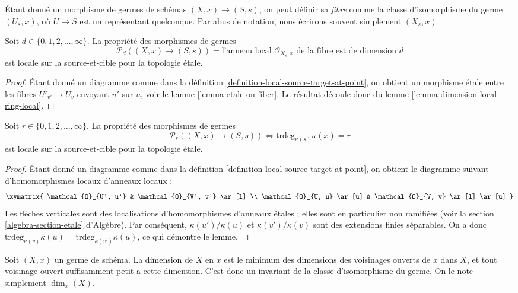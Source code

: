 \noindent
Étant donné un morphisme de germes de schémas $(X, x) \to (S, s)$,
on peut définir sa {\it fibre} comme la classe d'isomorphisme du germe
$(U_s, x)$, où $U \to S$ est un représentant quelconque. Par abus de
notation, nous écrirons souvent simplement $(X_s, x)$.

\begin{lemma}
\label{lemma-dimension-local-ring-fibre}
Soit $d \in \{0, 1, 2, \ldots, \infty\}$.
La propriété des morphismes de germes
$$
\mathcal{P}_d((X, x) \to (S, s)) =
\text{l'anneau local }
\mathcal{O}_{X_s, x}
\text{ de la fibre est de dimension }d
$$
est locale sur la source-et-cible pour la topologie \'etale.
\end{lemma}

\begin{proof}
Étant donné un diagramme comme dans la
définition \ref{definition-local-source-target-at-point}, on obtient un
morphisme \'etale entre les fibres $U'_{v'} \to U_v$ envoyant $u'$ sur $u$,
voir le lemme \ref{lemma-etale-on-fiber}. Le résultat découle donc du
lemme \ref{lemma-dimension-local-ring-local}.
\end{proof}

\begin{lemma}
\label{lemma-transcendence-degree-at-point}
Soit $r \in \{0, 1, 2, \ldots, \infty\}$.
La propriété des morphismes de germes
$$
\mathcal{P}_r((X, x) \to (S, s))
\Leftrightarrow
\text{trdeg}_{\kappa(s)} \kappa(x) = r
$$
est locale sur la source-et-cible pour la topologie \'etale.
\end{lemma}

\begin{proof}
Étant donné un diagramme comme dans la
définition \ref{definition-local-source-target-at-point}, on obtient le
diagramme suivant d'homomorphismes locaux d'anneaux locaux :
$$
\xymatrix{
\mathcal{O}_{U', u'} & \mathcal{O}_{V', v'} \ar[l] \\
\mathcal{O}_{U, u} \ar[u] & \mathcal{O}_{V, v} \ar[l] \ar[u]
}
$$
Les flèches verticales sont des localisations d'homomorphismes d'anneaux
étales ; elles sont en particulier non ramifiées (voir la
section \ref{algebra-section-etale} d'Algèbre).
Par conséquent, $\kappa(u')/\kappa(u)$ et $\kappa(v')/\kappa(v)$ sont des
extensions finies séparables. On a donc
$\text{trdeg}_{\kappa(v)} \kappa(u) = \text{trdeg}_{\kappa(v')} \kappa(u)$,
ce qui démontre le lemme.
\end{proof}

\noindent
Soit $(X, x)$ un germe de schéma. La dimension de $X$ en $x$ est le minimum
des dimensions des voisinages ouverts de $x$ dans $X$, et tout voisinage
ouvert suffisamment petit a cette dimension. C'est donc un invariant de la
classe d'isomorphisme du germe. On le note simplement $\dim_x(X)$.

